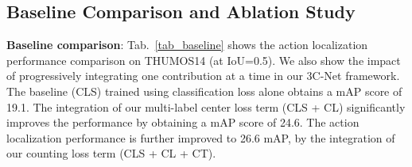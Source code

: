 \documentclass[10pt,twocolumn,letterpaper]{article}
\begin{document}
\begin{table}[t]
\centering
{}
 \vspace{0.05cm}
\caption{\label{tab_cls_sota}Action classification performance comparison (mAP) of our 3C-Net with state-of-the-art methods on the THUMOS14 and ActivityNet 1.2 datasets. On THUMOS14, our 3C-Net achieves superior classification result, compared to existing methods.}\vspace{-0.4cm}
\end{table}



\subsection{Baseline Comparison and Ablation Study\label{sec_ablation}}
\noindent\textbf{Baseline comparison}: 
Tab.~\ref{tab_baseline} shows the action localization performance comparison on THUMOS14 (at IoU=0.5). We also show the impact
of progressively integrating one contribution at a time in our 3C-Net framework. The baseline (CLS) trained using classification loss alone obtains a mAP score of 19.1. The integration of our multi-label center loss term (CLS + CL) significantly improves the performance by obtaining a mAP score of 24.6. The action localization performance is further improved to 26.6 mAP, by the integration of our counting loss term (CLS + CL + CT).
\end{document}
